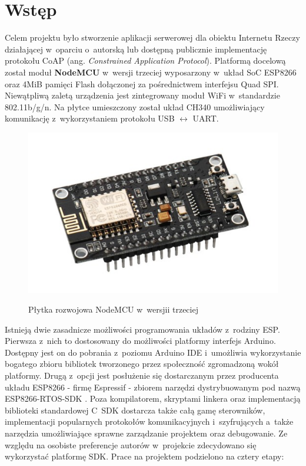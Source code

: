 \section{Wstęp}

Celem projektu było stworzenie aplikacji serwerowej dla obiektu Internetu Rzeczy działającej w~oparciu o~autorską lub dostępną publicznie implementację protokołu CoAP (ang. \textit{Constrained Application Protocol}). Platformą docelową został moduł \mbox{\textbf{NodeMCU}} w~wersji trzeciej wyposarzony w~układ SoC ESP8266 oraz 4MiB pamięci Flash dołączonej za pośrednictwem interfejsu Quad SPI. Niewątpliwą zaletą urządzenia jest zintegrowany moduł WiFi w~standardzie 802.11b/g/n. Na płytce umieszczony został układ CH340 umożliwiający komunikację z~wykorzystaniem protokołu USB $\leftrightarrow$ UART.

\begin{figure}[h]
    \centering
    \includegraphics[scale=0.6]{img/esp8266.jpg}
    \label{esp8266}
    \caption{Płytka rozwojowa NodeMCU w~wersjii trzeciej}
\end{figure}
\vspace{0.5cm}

Istnieją dwie zasadnicze możliwości programowania układów z~rodziny ESP. Pierwsza z~nich to dostosowany do możliwości platformy interfejs Arduino. Dostępny jest on do pobrania z~poziomu Arduino IDE i~umożliwia wykorzystanie bogatego zbioru bibliotek tworzonego przez społeczność zgromadzoną wokół platformy. Drugą z~opcji jest posłużenie się dostarczanym przez producenta układu ESP8266 - firmę Espressif - zbiorem narzędzi dystrybuowanym pod nazwą ESP8266-RTOS-SDK \cite{sdk}. Poza kompilatorem, skryptami linkera oraz implementacją biblioteki standardowej C~SDK dostarcza także całą gamę sterowników, implementacji popularnych protokołów komunikacyjnych i~szyfrujących a~także narzędzia umożliwiające sprawne zarządzanie projektem oraz debugowanie. Ze względu na osobiste preferencje autorów w~projekcie zdecydowano się wykorzystać platformę SDK. Prace na projektem podzielono na cztery etapy:

